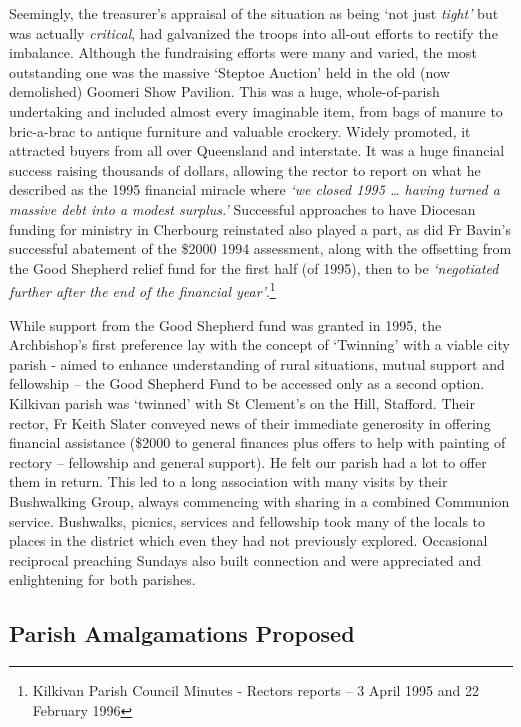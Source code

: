 Seemingly, the treasurer's appraisal of the situation as being `not just \emph{tight'} but was actually \emph{critical}, had galvanized the troops into all-out efforts to rectify the imbalance. Although the fundraising efforts were many and varied, the most outstanding one was the massive `Steptoe Auction' held in the old (now demolished) Goomeri Show Pavilion. This was a huge, whole-of-parish undertaking and included almost every imaginable item, from bags of manure to bric-a-brac to antique furniture and valuable crockery. Widely promoted, it attracted buyers from all over Queensland and interstate. It was a huge financial success raising thousands of dollars, allowing the rector to report on what he described as the 1995 financial miracle where \emph{`we closed 1995 \ldots{} having turned a massive debt into a modest surplus.'} Successful approaches to have Diocesan funding for ministry in Cherbourg reinstated also played a part, as did Fr Bavin's successful abatement of the \$2000 1994 assessment, along with the offsetting from the Good Shepherd relief fund for the first half (of 1995), then to be \emph{`negotiated further after the end of the financial year'}.\footnote{Kilkivan Parish Council Minutes - Rectors reports -- 3 April 1995 and 22 February 1996}

While support from the Good Shepherd fund was granted in 1995, the Archbishop's first preference lay with the concept of `Twinning' with a viable city parish - aimed to enhance understanding of rural situations, mutual support and fellowship -- the Good Shepherd Fund to be accessed only as a second option. Kilkivan parish was `twinned' with St Clement's on the Hill, Stafford. Their rector, Fr Keith Slater conveyed news of their immediate generosity in offering financial assistance (\$2000 to general finances plus offers to help with painting of rectory -- fellowship and general support). He felt our parish had a lot to offer them in return. This led to a long association with many visits by their Bushwalking Group, always commencing with sharing in a combined Communion service. Bushwalks, picnics, services and fellowship took many of the locals to places in the district which even they had not previously explored. Occasional reciprocal preaching Sundays also built connection and were appreciated and enlightening for both parishes.

\hypertarget{parish-amalgamations-proposed}{%
\subsection{Parish Amalgamations Proposed}\label{parish-amalgamations-proposed}}

